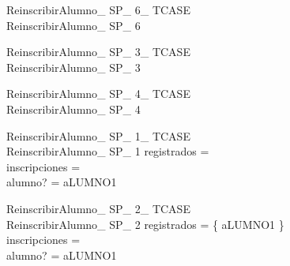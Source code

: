 \documentclass{article}
\begin{document}
\begin{schema}{ReinscribirAlumno\_ SP\_ 6\_ TCASE}\\
 ReinscribirAlumno\_ SP\_ 6
\end{schema}


\begin{schema}{ReinscribirAlumno\_ SP\_ 3\_ TCASE}\\
 ReinscribirAlumno\_ SP\_ 3
\end{schema}


\begin{schema}{ReinscribirAlumno\_ SP\_ 4\_ TCASE}\\
 ReinscribirAlumno\_ SP\_ 4
\end{schema}


\begin{schema}{ReinscribirAlumno\_ SP\_ 1\_ TCASE}\\
 ReinscribirAlumno\_ SP\_ 1 
\where
 registrados =~\emptyset \\
 inscripciones =~\emptyset \\
 alumno? = aLUMNO1
\end{schema}


\begin{schema}{ReinscribirAlumno\_ SP\_ 2\_ TCASE}\\
 ReinscribirAlumno\_ SP\_ 2 
\where
 registrados = \{ aLUMNO1 \} \\
 inscripciones =~\emptyset \\
 alumno? = aLUMNO1
\end{schema}
\end{document}

